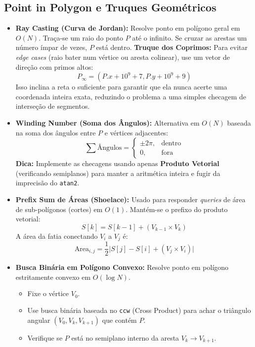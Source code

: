 \subsection{Point in Polygon e Truques Geométricos}

\begin{small}
\begin{itemize}
    \item \textbf{Ray Casting (Curva de Jordan):} Resolve ponto em polígono geral em $O(N)$. Traça-se um raio do ponto $P$ até o infinito. Se cruzar as arestas um número ímpar de vezes, $P$ está dentro.
    \textbf{Truque dos Coprimos:} Para evitar \textit{edge cases} (raio bater num vértice ou aresta colinear), use um vetor de direção com primos altos:
    \[
    P_{\infty} = (P.x + 10^9+7, P.y + 10^9+9)
    \]
    Isso inclina a reta o suficiente para garantir que ela nunca acerte uma coordenada inteira exata, reduzindo o problema a uma simples checagem de interseção de segmentos.

    \item \textbf{Winding Number (Soma dos Ângulos):} Alternativa em $O(N)$ baseada na soma dos ângulos entre $P$ e vértices adjacentes:
    \[
    \sum \text{Ângulos} = \begin{cases} \pm 2\pi, & \text{dentro} \\ 0, & \text{fora} \end{cases}
    \]
    \textbf{Dica:} Implemente as checagens usando apenas \textbf{Produto Vetorial} (verificando semiplanos) para manter a aritmética inteira e fugir da imprecisão do \texttt{atan2}.

    \item \textbf{Prefix Sum de Áreas (Shoelace):} Usado para responder \textit{queries} de área de sub-polígonos (cortes) em $O(1)$. Mantém-se o prefixo do produto vetorial:
    \[
    S[k] = S[k-1] + (V_{k-1} \times V_k)
    \]
    A área da fatia conectando $V_i$ a $V_j$ é:
    \[
    \text{Area}_{i,j} = \frac{1}{2} \Big| S[j] - S[i] + (V_j \times V_i) \Big|
    \]

    \item \textbf{Busca Binária em Polígono Convexo:} Resolve ponto em polígono estritamente convexo em $O(\log N)$.
    \begin{itemize}
        \item Fixe o vértice $V_0$.
        \item Use busca binária baseada no \texttt{ccw} (Cross Product) para achar o triângulo angular $(V_0, V_k, V_{k+1})$ que contém $P$.
        \item Verifique se $P$ está no semiplano interno da aresta $V_k \to V_{k+1}$.
    \end{itemize}
\end{itemize}
\end{small}

